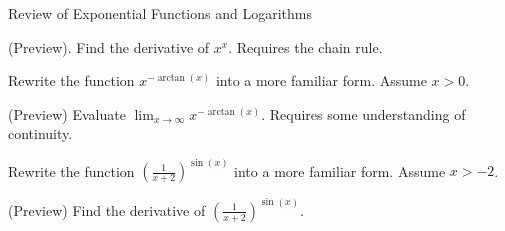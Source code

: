 \documentclass[../main.tex]{subfiles}
\begin{document}
\begin{lesson}{Review of Exponential Functions and Logarithms}
\begin{example}
    (Preview). Find the derivative of \(x^{x}\). Requires the chain rule.
  \end{example}
  \clearpage

  \begin{example}
    Rewrite the function \(x^{-\arctan(x)}\) into a more familiar form. Assume \(x > 0\). 

    (Preview) Evaluate \(\lim_{x \to \infty} x^{-\arctan(x)}\). Requires some understanding of continuity.
  \end{example}

  \begin{example}
    Rewrite the function \(\left(\frac{1}{x+2}\right)^{\sin(x)}\) into a more familiar form. Assume \(x > -2\). 

    (Preview) Find the derivative of \(\left(\frac{1}{x+2}\right)^{\sin(x)}\). 
  \end{example}
\end{lesson}
\end{document}
